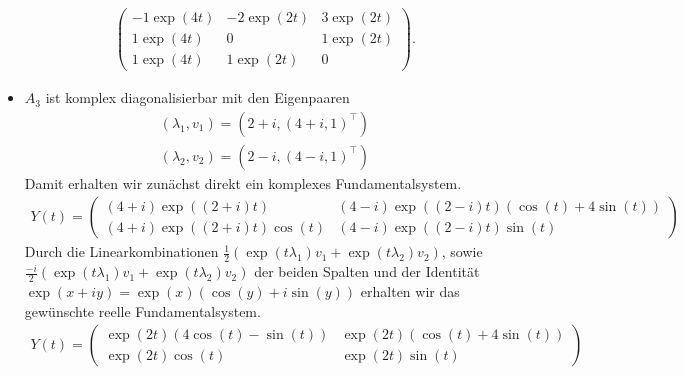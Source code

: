 \begin{solution}
\begin{itemize}
\begin{align*}
\begin{pmatrix}
    -1\exp(4t) & -2\exp(2t) & 3\exp(2t) \\
    1\exp(4t) & 0 & 1\exp(2t) \\
    1\exp(4t) & 1\exp(2t) & 0
    \end{pmatrix}.
  \end{align*}
  \item $A_3$ ist komplex diagonalisierbar mit den Eigenpaaren
  \begin{align*}
    (\lambda_1,v_1) = (2 + i,(4+i,1)^{\top}) \\
    (\lambda_2,v_2) = (2-i,(4-i,1)^{\top})
  \end{align*}
  Damit erhalten wir zunächst direkt ein komplexes Fundamentalsystem.
  \begin{align*}
  Y(t) = \begin{pmatrix}
    (4+i)\exp((2+i)t)  & (4-i)\exp((2-i)t)(\cos(t) + 4\sin(t)) \\
    (4+i)\exp((2+i)t)\cos(t) & (4-i)\exp((2-i)t)\sin(t)
  \end{pmatrix}
  \end{align*}
  Durch die Linearkombinationen $\frac{1}{2}(\exp(t\lambda_1)v_1 + \exp(t\lambda_2)v_2)$, sowie
  $\frac{-i}{2}(\exp(t\lambda_1)v_1 + \exp(t\lambda_2)v_2)$ der beiden Spalten und der Identität
  $\exp(x + iy) = \exp(x)(\cos(y) + i\sin(y))$ erhalten wir das gewünschte reelle
  Fundamentalsystem.
  \begin{align*}
    Y(t) = \begin{pmatrix}
      \exp(2t)(4\cos(t) -\sin(t))  & \exp(2t)(\cos(t) + 4\sin(t)) \\
      \exp(2t)\cos(t) & \exp(2t)\sin(t)
    \end{pmatrix}
  \end{align*}
\end{itemize}


\end{solution}
